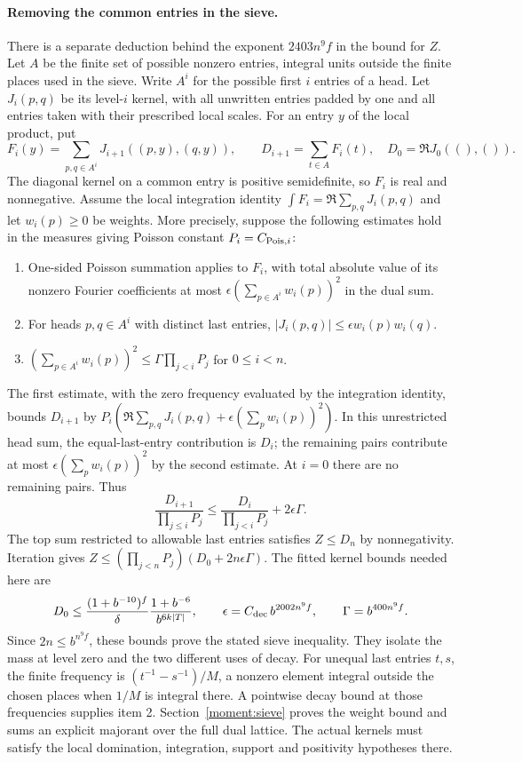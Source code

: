 \paragraph{Removing the common entries in the sieve.}
There is a separate deduction behind the exponent \(2403n^9f\) in
the bound for \(Z\). Let \(A\) be the finite set of possible
nonzero entries, integral units outside the finite places used in
the sieve. Write \(A^i\) for the possible first \(i\) entries of
a head. Let \(J_i(p,q)\) be its level-\(i\) kernel, with all
unwritten entries padded by one and all entries taken with their
prescribed local scales. For an entry \(y\) of the local product,
put
\[
 F_i(y)=\sum_{p,q\in A^i} J_{i+1}((p,y),(q,y)),\qquad
 D_{i+1}=\sum_{t\in A} F_i(t),\quad D_0=\Re J_0((),()) .
\]
The diagonal kernel on a common entry is positive semidefinite,
so \(F_i\) is real and nonnegative. Assume the local integration
identity \(\int F_i=\Re\sum_{p,q}J_i(p,q)\) and let \(w_i(p)\ge0\)
be weights. More precisely, suppose the following estimates hold
in the measures giving Poisson constant \(P_i=C_{{\rm Pois},i}\):
\begin{enumerate}
\item One-sided Poisson summation applies to \(F_i\), with total
absolute value of its nonzero Fourier coefficients at most
\(\epsilon(\sum_{p\in A^i}w_i(p))^2\) in the dual sum.
\item For heads \(p,q\in A^i\) with distinct last entries,
\( |J_i(p,q)|\le\epsilon w_i(p)w_i(q)\).
\item \((\sum_{p\in A^i}w_i(p))^2\le
  \Gamma\prod_{j<i}P_j\) for \(0\le i<n\).
\end{enumerate}
The first estimate, with the zero frequency evaluated by the
integration identity, bounds \(D_{i+1}\) by
\(P_i(\Re\sum_{p,q}J_i(p,q)+\epsilon(\sum_p w_i(p))^2)\).
In this unrestricted head sum, the equal-last-entry contribution is
\(D_i\); the remaining pairs contribute at most
\(\epsilon(\sum_p w_i(p))^2\) by the second estimate.
At \(i=0\) there are no remaining pairs. Thus
\[
 \frac{D_{i+1}}{\prod_{j\le i}P_j}
 \le \frac{D_i}{\prod_{j<i}P_j}+2\epsilon\Gamma .
\]
The top sum restricted to allowable last entries satisfies \(Z\le D_n\)
by nonnegativity. Iteration gives
\(Z\le(\prod_{j<n}P_j)(D_0+2n\epsilon\Gamma)\).
The fitted kernel bounds needed here are
\[
 D_0\le \frac{(1+b^{-10})^f}{\delta}
           \frac{1+b^{-6}}{b^{6k|T|}},\qquad
 \epsilon=C_{\rm dec}\,b^{2002n^9f},\qquad
 \Gamma=b^{400n^9f}.
\]
Since \(2n\le b^{n^9 f}\), these bounds prove the stated sieve
inequality. They isolate the mass at level zero and the two
different uses of decay. For unequal last entries \(t,s\), the
finite frequency is \((t^{-1}-s^{-1})/M\), a nonzero element
integral outside the chosen places when \(1/M\) is integral there.
A pointwise decay bound at those frequencies supplies item 2.
Section~\ref{moment:sieve} proves the weight bound and sums an explicit
majorant over the full dual lattice. The actual kernels must satisfy
the local domination, integration, support and positivity hypotheses there.
